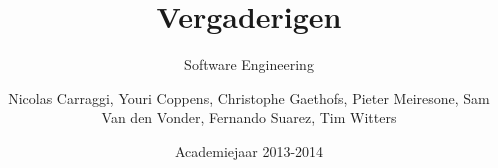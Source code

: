 \author{Nicolas Carraggi, Youri Coppens, Christophe Gaethofs, Pieter Meiresone, Sam Van den Vonder, Fernando Suarez, Tim Witters}
\title{Vergaderigen}
\subtitle{Software Engineering} 
\date{Academiejaar 2013-2014}


\makeassignment